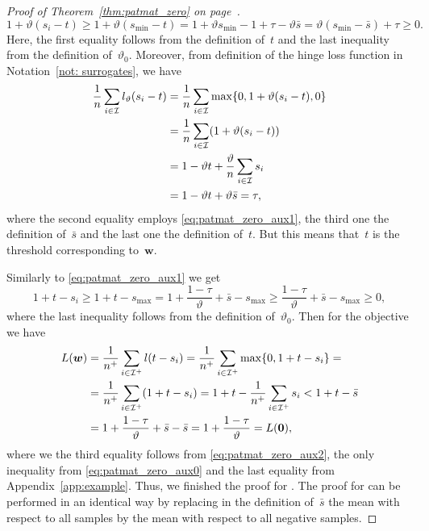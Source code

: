\begin{proof}[Proof of Theorem~\ref{thm:patmat_zero} on page~\pageref{thm:patmat_zero}]
\begin{equation}
    1+\vartheta(s_i - t)
      \ge 1 + \vartheta(s_{\min} - t)
      = 1 + \vartheta s_{\min} - 1 + \tau - \vartheta\bar{s}
      = \vartheta (s_{\min} - \bar{s}) + \tau
      \ge 0.
  \end{equation}
  Here, the first equality follows from the definition of~$t$ and the last inequality from the definition of~$\vartheta_0$. Moreover, from definition of the hinge loss function in Notation~\ref{not: surrogates}, we have
  \begin{equation*}
    \begin{aligned}
      \frac{1}{n} \sum_{i \in \I} l_{\vartheta}(s_i - t)
      & = \frac{1}{n} \sum_{i \in \I} \max\{0, 1 + \vartheta (s_i - t), 0\} \\
      & = \frac{1}{n}\sum_{i \in \I}\Brac{1 + \vartheta(s_i - t)} \\
      & = 1 - \vartheta t + \frac{\vartheta}{n} \sum_{i \in \I} s_i \\
      & = 1 - \vartheta t + \vartheta \bar{s} = \tau,
    \end{aligned}
  \end{equation*}
  where the second equality employs \eqref{eq:patmat_zero_aux1}, the third one the definition of~$\bar{s}$ and the last one the definition of~$t$. But this means that~$t$ is the threshold corresponding to~$\bm{w}$.
  
  Similarly to \eqref{eq:patmat_zero_aux1} we get
  \begin{equation}\label{eq:patmat_zero_aux2}
    1 + t - s_i
    \ge 1 + t-s_{\max}
    =   1 + \frac{1-\tau}{\vartheta} + \bar{s} - s_{\max}
    \ge \frac{1-\tau}{\vartheta} + \bar{s} - s_{\max}
    \ge 0,
  \end{equation}
  where the last inequality follows from the definition of~$\vartheta_0$. Then for the objective we have
  \begin{equation*}
    \begin{aligned}
      L(\bm{w})
      & = \frac{1}{n^+}\sum_{i \in \I^+}l(t-s_i)
        = \frac{1}{n^+}\sum_{i \in \I^+}\max\{0, 1+t-s_i \} = \\
      & = \frac{1}{n^+}\sum_{i \in \I^+}\Brac{1+t-s_i}
        = 1 + t - \frac{1}{n^+}\sum_{i \in \I^+} s_i
        < 1 + t - \bar{s} \\
      & = 1 + \frac{1-\tau}{\vartheta} + \bar{s} -\bar{s}
        = 1 + \frac{1-\tau}{\vartheta}
        = L(\bm{0}),\\
    \end{aligned}
  \end{equation*}
  where we the third equality follows from \eqref{eq:patmat_zero_aux2}, the only inequality from \eqref{eq:patmat_zero_aux0} and the last equality from Appendix~\ref{app:example}. Thus, we finished the proof for \PatMat. The proof for \PatMatNP can be performed in an identical way by replacing in the definition of~$\bar{s}$ the mean with respect to all samples by the mean with respect to all negative samples.
\end{proof}

